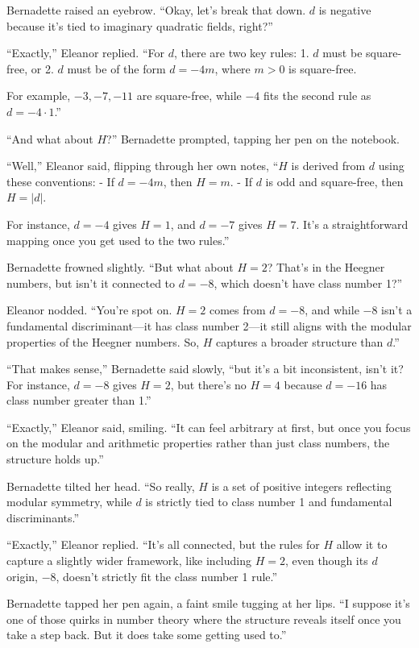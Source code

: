 Bernadette raised an eyebrow. “Okay, let’s break that down. \(d\) is negative because it’s tied to imaginary quadratic fields, right?”

“Exactly,” Eleanor replied. “For \(d\), there are two key rules:
1. \(d\) must be square-free, or
2. \(d\) must be of the form \(d = -4m\), where \(m > 0\) is square-free.

For example, \(-3, -7, -11\) are square-free, while \(-4\) fits the second rule as \(d = -4 \cdot 1\).”

“And what about \(H\)?” Bernadette prompted, tapping her pen on the notebook.

“Well,” Eleanor said, flipping through her own notes, “\(H\) is derived from \(d\) using these conventions:
- If \(d = -4m\), then \(H = m\).
- If \(d\) is odd and square-free, then \(H = |d|\).

For instance, \(d = -4\) gives \(H = 1\), and \(d = -7\) gives \(H = 7\). It’s a straightforward mapping once you get used to the two rules.”

Bernadette frowned slightly. “But what about \(H = 2\)? That’s in the Heegner numbers, but isn’t it connected to \(d = -8\), which doesn’t have class number 1?”

Eleanor nodded. “You’re spot on. \(H = 2\) comes from \(d = -8\), and while \(-8\) isn’t a fundamental discriminant—it has class number 2—it still aligns with the modular properties of the Heegner numbers. So, \(H\) captures a broader structure than \(d\).”

“That makes sense,” Bernadette said slowly, “but it’s a bit inconsistent, isn’t it? For instance, \(d = -8\) gives \(H = 2\), but there’s no \(H = 4\) because \(d = -16\) has class number greater than 1.”

“Exactly,” Eleanor said, smiling. “It can feel arbitrary at first, but once you focus on the modular and arithmetic properties rather than just class numbers, the structure holds up.”

Bernadette tilted her head. “So really, \(H\) is a set of positive integers reflecting modular symmetry, while \(d\) is strictly tied to class number 1 and fundamental discriminants.”

“Exactly,” Eleanor replied. “It’s all connected, but the rules for \(H\) allow it to capture a slightly wider framework, like including \(H = 2\), even though its \(d\) origin, \(-8\), doesn’t strictly fit the class number 1 rule.”

Bernadette tapped her pen again, a faint smile tugging at her lips. “I suppose it’s one of those quirks in number theory where the structure reveals itself once you take a step back. But it does take some getting used to.”

